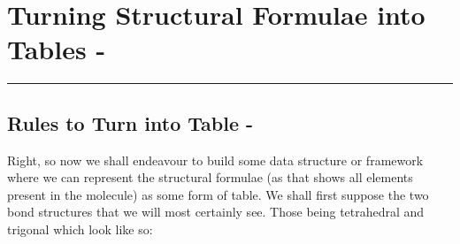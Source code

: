 \documentclass[a4paper,10pt]{article}
\begin{document}
\begin{table}[H]
\captionsetup{justification=centering}
\noindent{}
\caption{\small{The 20 Natural Amino Acids with Their 3 \& 1 Letter Codes}}
\label{tab:tnaa}
\end{table}
\section{Turning Structural Formulae into Tables -}
\rule{\textwidth}{1pt}
\subsection{Rules to Turn into Table -}
Right, so now we shall endeavour to build some data structure or framework where we can represent the structural formulae (as that shows all elements present in the molecule) as some form of table. We shall first suppose the two bond structures that we will most certainly see. Those being tetrahedral and trigonal which look like so:
\end{document}
